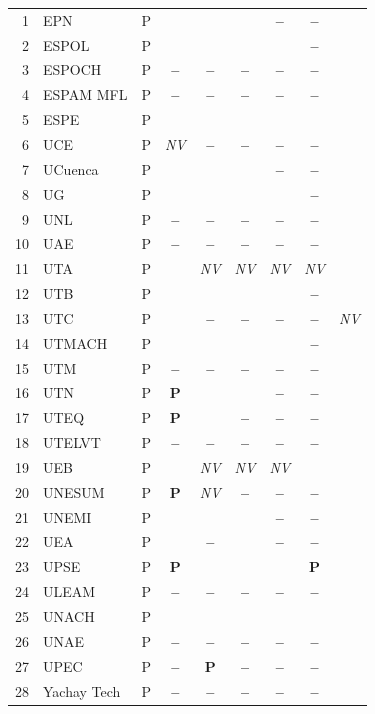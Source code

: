 \documentclass[pdflatex,sn-basic,Numbered,iicol]{sn-jnl}
\newcommand{\si}{\ding{51}}
\newcommand{\no}{\textcolor{gris}{\textbf{--}}}
\newcommand{\pc}{\textbf{P}}
\newcommand{\nv}{\textsl{\footnotesize NV}}
\theoremstyle{thmstyleone}
\theoremstyle{thmstyletwo}
\theoremstyle{thmstylethree}
\begin{document}
\begin{appendices}
\begin{longtable}{@{}r l c c c c c c c@{}}
	1 & EPN & P & \si & \si & \si & \no & \no & \si \\
	2 & ESPOL & P & \si & \si & \si & \si & \no & \si \\
	3 & ESPOCH & P & \no & \no & \no & \no & \no & \si \\
	4 & ESPAM MFL & P & \no & \no & \no & \no & \no & \si \\
	5 & ESPE & P & \si & \si & \si & \si & \si & \si \\
	6 & UCE & P & \nv & \no & \no & \no & \no & \si \\
	7 & UCuenca & P & \si & \si & \si & \no & \no & \si \\
	8 & UG & P & \si & \si & \si & \si & \no & \si \\
	9 & UNL & P & \no & \no & \no & \no & \no & \si \\
	10 & UAE & P & \no & \no & \no & \no & \no & \si \\
	11 & UTA & P & \si & \nv & \nv & \nv & \nv & \si \\
	12 & UTB & P & \si & \si & \si & \si & \no & \si \\
	13 & UTC & P & \si & \no & \no & \no & \no & \nv \\
	14 & UTMACH & P & \si & \si & \si & \si & \no & \si \\
	15 & UTM & P & \no & \no & \no & \no & \no & \si \\
	16 & UTN & P & \pc & \si & \si & \no & \no & \si \\
	17 & UTEQ & P & \pc & \si & \no & \no & \no & \si \\
	18 & UTELVT & P & \no & \no & \no & \no & \no & \si \\
	19 & UEB & P & \si & \nv & \nv & \nv & \si & \si \\
	20 & UNESUM & P & \pc & \nv & \no & \no & \no & \si \\
	21 & UNEMI & P & \si & \si & \si & \no & \no & \si \\
	22 & UEA & P & \si & \no & \si & \no & \no & \si \\
	23 & UPSE & P & \pc & \si & \si & \si & \pc & \si \\
	24 & ULEAM & P & \no & \no & \no & \no & \no & \si \\
	25 & UNACH & P & \si & \si & \si & \si & \si & \si \\
	26 & UNAE & P & \no & \no & \no & \no & \no & \si \\
	27 & UPEC & P & \no & \pc & \no & \no & \no & \si \\
	28 & Yachay Tech & P & \no & \no & \no & \no & \no & \si \\

\end{longtable}
\end{appendices}
\end{document}
